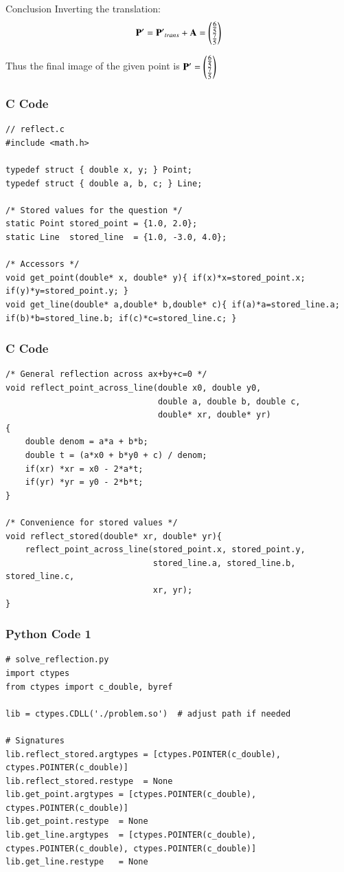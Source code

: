 \documentclass{beamer}
\begin{document}
\begin{frame}{Conclusion}
Inverting the translation:
\begin{align}
    \mathbf{P'}=\mathbf{P'}_{trans}+\mathbf{A}=\begin{pmatrix}\frac{6}{5}\\ \frac{7}{5}\end{pmatrix}
\end{align}

Thus the final image of the given point is $\mathbf{P'}=\begin{pmatrix}\frac{6}{5}\\ \frac{7}{5}\end{pmatrix}$
\end{frame}

\begin{frame}[fragile]
    \frametitle{C Code}
    \begin{lstlisting}
// reflect.c
#include <math.h>

typedef struct { double x, y; } Point;
typedef struct { double a, b, c; } Line;

/* Stored values for the question */
static Point stored_point = {1.0, 2.0};
static Line  stored_line  = {1.0, -3.0, 4.0};

/* Accessors */
void get_point(double* x, double* y){ if(x)*x=stored_point.x; if(y)*y=stored_point.y; }
void get_line(double* a,double* b,double* c){ if(a)*a=stored_line.a; if(b)*b=stored_line.b; if(c)*c=stored_line.c; }
    \end{lstlisting}
\end{frame}

\begin{frame}[fragile]
    \frametitle{C Code}
    \begin{lstlisting}
/* General reflection across ax+by+c=0 */
void reflect_point_across_line(double x0, double y0,
                               double a, double b, double c,
                               double* xr, double* yr)
{
    double denom = a*a + b*b;
    double t = (a*x0 + b*y0 + c) / denom;
    if(xr) *xr = x0 - 2*a*t;
    if(yr) *yr = y0 - 2*b*t;
}

/* Convenience for stored values */
void reflect_stored(double* xr, double* yr){
    reflect_point_across_line(stored_point.x, stored_point.y,
                              stored_line.a, stored_line.b, stored_line.c,
                              xr, yr);
}
    \end{lstlisting}
\end{frame}

\begin{frame}[fragile]
    \frametitle{Python Code 1}
    \begin{lstlisting}
# solve_reflection.py
import ctypes
from ctypes import c_double, byref

lib = ctypes.CDLL('./problem.so')  # adjust path if needed

# Signatures
lib.reflect_stored.argtypes = [ctypes.POINTER(c_double), ctypes.POINTER(c_double)]
lib.reflect_stored.restype  = None
lib.get_point.argtypes = [ctypes.POINTER(c_double), ctypes.POINTER(c_double)]
lib.get_point.restype  = None
lib.get_line.argtypes  = [ctypes.POINTER(c_double), ctypes.POINTER(c_double), ctypes.POINTER(c_double)]
lib.get_line.restype   = None
    \end{lstlisting}
\end{frame}
\end{document}
